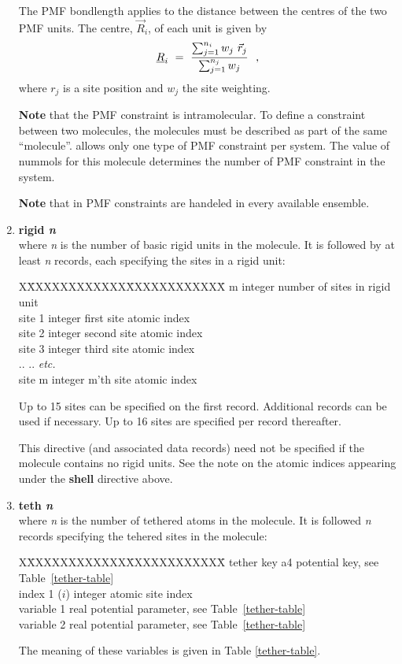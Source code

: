 \begin{enumerate}
The PMF bondlength applies to the distance between the centres of the
two PMF units.  The centre, $\vec{R}_{i}$, of each unit is given by
\begin{equation}
\mbox{$\underline{R}$}_{i}~=~\frac{\sum_{j=1}^{n_{i}} w_{j}~\vec{r}_{j}}{\sum_{j=1}^{n_{j}} w_{j}}~~,
\end{equation}
where $r_{j}$ is a site position and $w_{j}$ the site weighting.

{\bf Note} that the PMF constraint is intramolecular.  To define
a constraint between two molecules, the molecules must be described as
part of the same \D ``molecule''.  \D allows only one type of PMF
constraint per system.  The value of nummols for this molecule
determines the number of PMF constraint in the system.

{\bf Note} that in \D PMF constraints are handeled in every available
ensemble.

\item{\bf rigid {\em n}}\\
where {\em n} is the number of basic rigid units in the molecule.  It is
followed by at least {\em n} records, each specifying the sites in a rigid
unit:
\begin{tabbing}
X\=XXXXXXXXXXXX\=XXXXXXXXXXXX\=\kill
\> m      \> integer \> number of sites in rigid unit \\
\> site 1 \> integer \> first site atomic index \\
\> site 2 \> integer \> second site atomic index \\
\> site 3 \> integer \> third site atomic index \\
\> .. \> .. \> {\em etc.} \\
\> site m \> integer \> m'th site atomic index
\end{tabbing}
Up to 15 sites can be specified on the first record.  Additional records
can be used if necessary.  Up to 16 sites are specified per record thereafter.

This directive (and associated data records) need not be specified if the
molecule contains no rigid units.  See the note on the atomic indices
appearing under the {\bf shell} directive above.

\item{\bf teth {\em n}} \\
where {\em n} is the number of tethered atoms in the molecule.  It
is followed {\em n} records specifying the tehered sites in the
molecule:
\begin{tabbing}
X\=XXXXXXXXXXXX\=XXXXXXXXXXXX\=\kill
\> tether key    \> a4      \> potential key, see Table~\ref{tether-table} \\
\> index 1 ($i$) \> integer \> atomic site index \\
\> variable 1    \> real    \> potential parameter, see Table~\ref{tether-table} \\
\> variable 2    \> real    \> potential parameter, see Table~\ref{tether-table}
\end{tabbing}
The meaning of these variables is given in Table
\ref{tether-table}.


\end{enumerate}
